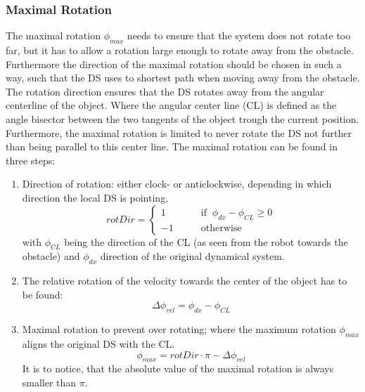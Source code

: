 \subsubsection{Maximal Rotation}
The maximal rotation $\phi_{max}$ needs to ensure that the system does not rotate too far, but it has to allow a rotation large enough to rotate away from the obstacle. Furthermore the direction of the maximal rotation should be chosen in such a way, such that the DS uses to shortest path when moving away from the obstacle. \\
The rotation direction ensures that the DS rotates away from the angular centerline of the object. Where the angular center line (CL) is defined as the angle bisector between the two tangents of the object trough the current position. Furthermore, the maximal rotation is limited to never rotate the DS not further than being parallel to this center line.
The maximal rotation can be found in three steps:\\
\begin{enumerate}
\item Direction of rotation: either clock- or anticlockwise, depending in which direction the local DS is pointing.
  \begin{equation}
    rotDir =
\begin{cases}
1 \qquad &  \text{if} \;\;\phi_{dx} - \phi_{CL} \geq 0 \\
-1 \qquad &\text{otherwise}
\end{cases}
\end{equation}
with $\phi_{CL}$ being the direction of the CL (as seen from the robot towards the obstacle) and $\phi_{dx}$ direction of the original dynamical system. \\

\item The relative rotation of the velocity towards the center of the object has to be found:
\begin{equation}
\Delta \phi_{vel} = \phi_{dx} - \phi_{CL}
\end{equation}

\item Maximal rotation to prevent over rotating; where the maximum rotation $\phi_{max}$ aligns the original DS with the CL.
\begin{equation}
\phi_{max} = rotDir \cdot \pi - \Delta \phi_{vel}
\end{equation}
It is to notice, that the absolute value of the maximal rotation is always smaller than $\pi$.
\end{enumerate}

